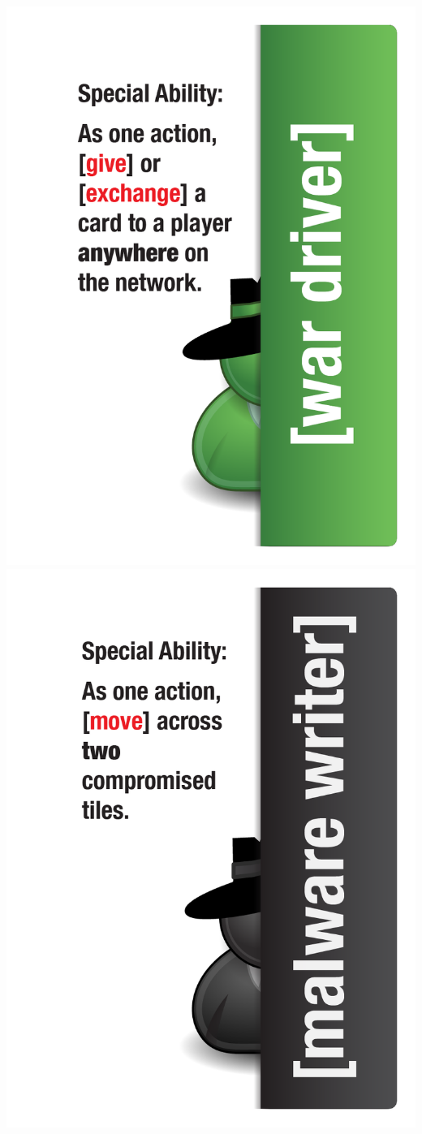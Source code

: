 \documentclass{letter}
\begin{document}
\includegraphics{characters/character_war_driver}
\includegraphics{characters/character_malware_writer}
\end{document}
